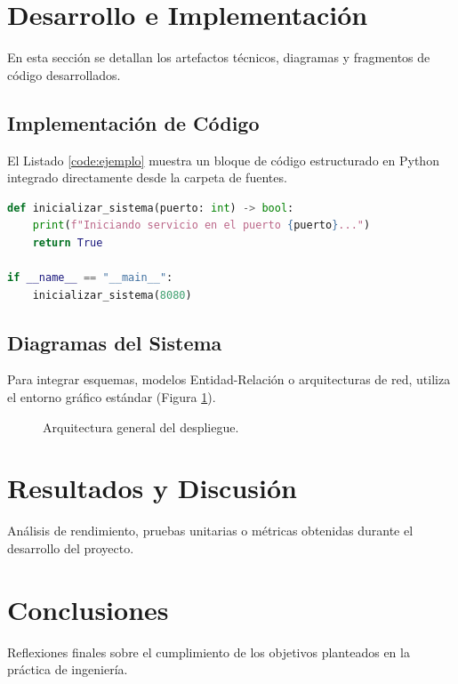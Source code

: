 \documentclass[12pt,letterpaper]{article}
\begin{document}
\section{Desarrollo e Implementación}
\label{sec:desarrollo}

En esta sección se detallan los artefactos técnicos, diagramas y fragmentos de código desarrollados.

\subsection{Implementación de Código}
El Listado \ref{code:ejemplo} muestra un bloque de código estructurado en Python integrado directamente desde la carpeta de fuentes.

\begin{lstlisting}[language=Python, caption={Script de automatización base.}, label={code:ejemplo}]
def inicializar_sistema(puerto: int) -> bool:
    print(f"Iniciando servicio en el puerto {puerto}...")
    return True

if __name__ == "__main__":
    inicializar_sistema(8080)
\end{lstlisting}

\subsection{Diagramas del Sistema}
Para integrar esquemas, modelos Entidad-Relación o arquitecturas de red, utiliza el entorno gráfico estándar (Figura \ref{fig:arquitectura}).

\begin{figure}[H]
    \centering
    \caption{Arquitectura general del despliegue.}
    \label{fig:arquitectura}
\end{figure}

\section{Resultados y Discusión}
\label{sec:resultados}
Análisis de rendimiento, pruebas unitarias o métricas obtenidas durante el desarrollo del proyecto.

\section{Conclusiones}
\label{sec:conclusiones}
Reflexiones finales sobre el cumplimiento de los objetivos planteados en la práctica de ingeniería.

\newpage
\printbibliography[title={Referencias}]
\end{document}
